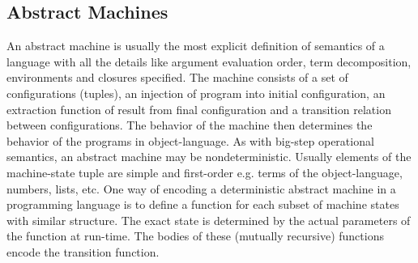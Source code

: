 \subsection*{Abstract Machines}
An abstract machine is usually the most explicit definition of semantics of a language with all the details like argument evaluation order, term decomposition, environments and closures specified.
The machine consists of a set of configurations (tuples), an injection of program into initial configuration, an extraction function of result from final configuration and a transition relation between configurations.
The behavior of the machine then determines the behavior of the programs in object-language.
As with big-step operational semantics, an abstract machine may be nondeterministic.
Usually elements of the machine-state tuple are simple and first-order e.g. terms of the object-language, numbers, lists, etc.
One way of encoding a deterministic abstract machine in a programming language is to define a function for each subset of machine states with similar structure.
The exact state is determined by the actual parameters of the function at run-time.
The bodies of these (mutually recursive) functions encode the transition function.
